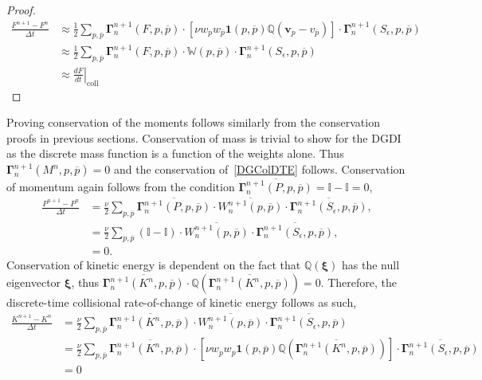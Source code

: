 \documentclass[preprint,12pt]{elsarticle}
\theoremstyle{definition}
\begin{document}
\begin{proof}
\begin{align*}
\frac{F^{n+1} - F^{n}}{\Delta t} &\approx \frac{1}{2} \sum_{p,\overline{p}} \boldsymbol{\Gamma}^{n+1}_{n} (F,p,\overline{p}) \cdot \left[ \nu w_{p} w_{\overline{p}} \boldsymbol{1}(p, \overline{p}) \mathbb{Q}\left( \boldsymbol{v}_p - v_{\overline{p}}\right) \right] \cdot \boldsymbol{\Gamma}^{n+1}_{n} (S_{\epsilon},p,\overline{p}) \\
&\approx \frac{1}{2} \sum_{p,\overline{p}} \boldsymbol{\Gamma}^{n+1}_{n} (F,p,\overline{p}) \cdot \mathbb{W}(p, \overline{p}) \cdot \boldsymbol{\Gamma}^{n+1}_{n} (S_{\epsilon},p,\overline{p})\\
&\approx  \left. \frac{d F}{d t}\right|_{\text {coll }}
\end{align*}
\end{proof}

Proving conservation of the moments follows similarly from the conservation proofs in previous sections. Conservation of mass is trivial to show for the DGDI as the discrete mass function is a function of the weights alone. Thus $\boldsymbol{\Gamma}^{n+1}_{n}(M^n, p, \overline{p}) = 0$ and the conservation of~\eqref{DGColDTE} follows. Conservation of momentum again follows from the condition $\overline{\boldsymbol{\Gamma}^{n+1}_{n}(P, p, \overline{p})} = \mathbb{I} - \mathbb{I} = 0$,
\begin{align*}
\frac{P^{n+1}-P^{n}}{\Delta t} &= \frac{\nu}{2} \sum_{p, \overline{p}} \overline{\boldsymbol{\Gamma}_{n}^{n+1}(P, p, \overline{p})} \cdot \overline{W_{n}^{n+1}(p, \overline{p})} \cdot \overline{\boldsymbol{\Gamma}_{n}^{n+1}\left(S_{\epsilon}, p, \overline{p}\right)}, \\
&= \frac{\nu}{2} \sum_{p, \overline{p}} (\mathbb{I} - \mathbb{I}) \cdot \overline{W_{n}^{n+1}(p, \overline{p})} \cdot \overline{\boldsymbol{\Gamma}_{n}^{n+1}\left(S_{\epsilon}, p, \overline{p}\right)}, \\
&= 0.
\end{align*}
Conservation of kinetic energy is dependent on the fact that $\mathbb{Q}(\boldsymbol{\xi})$ has the null eigenvector $\boldsymbol{\xi}$, thus $\overline{\boldsymbol{\Gamma}_{n}^{n+1}(K^n, p, \overline{p})} \cdot \mathbb{Q}(\overline{\boldsymbol{\Gamma}_{n}^{n+1}(K^n, p, \overline{p})}) = 0$. Therefore, the discrete-time collisional rate-of-change of kinetic energy follows as such,
\begin{align*}
\frac{K^{n+1}-K^{n}}{\Delta t}&=\frac{\nu}{2} \sum_{p, \overline{p}} \overline{\boldsymbol{\Gamma}_{n}^{n+1}(K^n, p, \overline{p})} \cdot \overline{W_{n}^{n+1}(p, \overline{p})} \cdot \overline{\boldsymbol{\Gamma}_{n}^{n+1}\left(S_{\epsilon}, p, \overline{p}\right)} \\
&=\frac{\nu}{2} \sum_{p, \overline{p}} \overline{\boldsymbol{\Gamma}_{n}^{n+1}(K^n, p, \overline{p})} \cdot \left[ \nu w_{p} w_{\overline{p}} \boldsymbol{1}(p, \overline{p}) \mathbb{Q}\left(\overline{\boldsymbol{\Gamma}_{n}^{n+1}(K^n, p, \overline{p})}\right) \right] \cdot \overline{\boldsymbol{\Gamma}_{n}^{n+1}\left(S_{\epsilon}, p, \overline{p}\right)} \\
&= 0
\end{align*}
\end{document}
